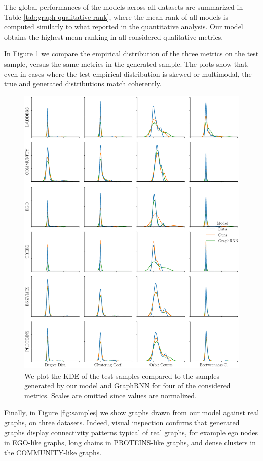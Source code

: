 The global performances of the models across all datasets are summarized in Table \ref{tab:graph-qualitative-rank}, where the mean rank of all models is computed similarly to what reported in the quantitative analysis. Our model obtains the highest mean ranking in all considered qualitative metrics.

In Figure \ref{fig:distributions} we compare the empirical distribution of the three metrics on the test sample, versus the same metrics in the generated sample. The plots show that, even in cases where the test empirical distribution is skewed or multimodal, the true and generated distributions match coherently.
\begin{figure}[h!]
\centering
\includegraphics[width=\textwidth]{Figures/Chapter6/displot.eps}
\caption{We plot the KDE of the test samples compared to the samples generated by our model and GraphRNN for four of the considered metrics. Scales are omitted since values are normalized.}
\label{fig:distributions}
\end{figure}
Finally, in Figure \ref{fig:samples} we show graphs drawn from our model against real graphs, on three datasets. Indeed, visual inspection confirms that generated graphs display connectivity patterns typical of real graphs, for example ego nodes in EGO-like graphs, long chains in PROTEINS-like graphs, and dense clusters in the COMMUNITY-like graphs.
